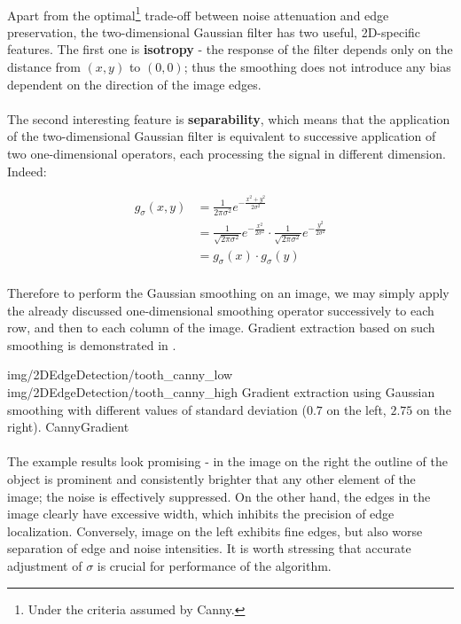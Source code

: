 \paragraph*{}
Apart from the optimal\footnote{Under the criteria assumed by Canny.} trade-off between noise attenuation and edge preservation, the two-dimensional Gaussian filter has two useful, 2D-specific features. The first one is \textbf{isotropy} - the response of the filter depends only on the distance from $(x,y)$ to $(0,0)$; thus the smoothing does not introduce any bias dependent on the direction of the image edges. 

\paragraph*{}
The second interesting feature is \textbf{separability}, which means that the application of the two-dimensional Gaussian filter is equivalent to successive application of two one-dimensional operators, each processing the signal in different dimension. Indeed:

\begin{align*}
    g_{\sigma}(x,y) &= \frac{1}{2\pi \sigma^2} e^{-\frac{x^2+y^2}{2 \sigma^2}} \\
    				&= \frac{1}{\sqrt{2\pi \sigma^2}} e^{-\frac{x^2}{2 \sigma^2}} \cdot \frac{1}{\sqrt{2\pi \sigma^2}} e^{-\frac{y^2}{2 \sigma^2}} \\
    				&= g_{\sigma}(x)\cdot g_{\sigma}(y)
\end{align*}

\paragraph*{}
Therefore to perform the Gaussian smoothing on an image, we may simply apply the already discussed one-dimensional smoothing operator successively to each row, and then to each column of the image. Gradient extraction based on such smoothing is demonstrated in .

\twoFigures
{img/2DEdgeDetection/tooth_canny_low}
{img/2DEdgeDetection/tooth_canny_high}
{Gradient extraction using Gaussian smoothing with different values of standard deviation ($0.7$ on the left, $2.75$ on the right).}
{CannyGradient}
{\basicWidth}

\paragraph*{}
The example results look promising - in the image on the right the outline of the object is prominent and consistently brighter that any other element of the image; the noise is effectively suppressed. On the other hand, the edges in the image clearly have excessive width, which inhibits the precision of edge localization. Conversely, image on the left exhibits fine edges, but also worse separation of edge and noise intensities. It is worth stressing that accurate adjustment of $\sigma$ is crucial for performance of the algorithm.

